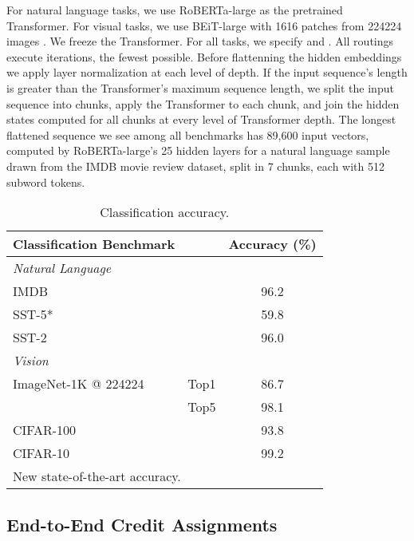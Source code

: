 \documentclass[11pt,a4paper]{article}
\begin{document}
For natural language tasks, we use RoBERTa-large \cite{DBLP:journals/corr/abs-1907-11692} as the pretrained Transformer. For visual tasks, we use BEiT-large with 1616 patches from 224224 images \cite{hangbo2021beit}. We freeze the Transformer. For all tasks, we specify  and . All routings execute  iterations, the fewest possible. Before flattenning the hidden embeddings we apply layer normalization at each level of depth. If the input sequence's length is greater than the Transformer's maximum sequence length, we split the input sequence into chunks, apply the Transformer to each chunk, and join the hidden states computed for all chunks at every level of Transformer depth. The longest flattened sequence we see among all benchmarks has 89,600 input vectors, computed by RoBERTa-large's 25 hidden layers for a natural language sample drawn from the IMDB movie review dataset, split in 7 chunks, each with 512 subword tokens.

\begin{table}[h]
	\begin{center}
		\small
		\vskip 0.1in
		\begin{tabular}{llc}
			\toprule
			Classification Benchmark        &      & Accuracy (\%) \\
			\midrule
			\em Natural Language            &      &        \\
			IMDB                            &      &   96.2 \\
			SST-5*                          &      &   59.8 \\
			SST-2                           &      &   96.0 \\
			\midrule
			\em Vision                      &      &        \\
			ImageNet-1K @ 224224    & Top1 &   86.7 \\
			                                & Top5 &   98.1 \\
			CIFAR-100                       &      &   93.8 \\
			CIFAR-10                        &      &   99.2 \\
			\bottomrule
			\multicolumn{2}{l}{\small * New state-of-the-art accuracy.}
		\end{tabular}
        \caption{\label{tab:accuracies}Classification accuracy.}
		\vskip 0.25in
	\end{center}
\end{table}

\subsection{End-to-End Credit Assignments}
\end{document}
